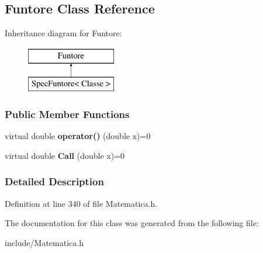 \hypertarget{classFuntore}{\subsection{\-Funtore \-Class \-Reference}
\label{classFuntore}
}
\-Inheritance diagram for \-Funtore\-:\begin{figure}[H]
\begin{center}
\leavevmode
\includegraphics[height=2.000000cm]{classFuntore}
\end{center}
\end{figure}
\subsubsection*{\-Public \-Member \-Functions}
\begin{DoxyCompactItemize}
\item 
\hypertarget{classFuntore_a98ed28d91355af58355955ba885ebacb}{virtual double {\bfseries operator()} (double x)=0}\label{classFuntore_a98ed28d91355af58355955ba885ebacb}

\item 
\hypertarget{classFuntore_af020783f738a26ffbc75399721893712}{virtual double {\bfseries \-Call} (double x)=0}\label{classFuntore_af020783f738a26ffbc75399721893712}

\end{DoxyCompactItemize}


\subsubsection{\-Detailed \-Description}


\-Definition at line 340 of file \-Matematica.\-h.



\-The documentation for this class was generated from the following file\-:\begin{DoxyCompactItemize}
\item 
include/\-Matematica.\-h\end{DoxyCompactItemize}
